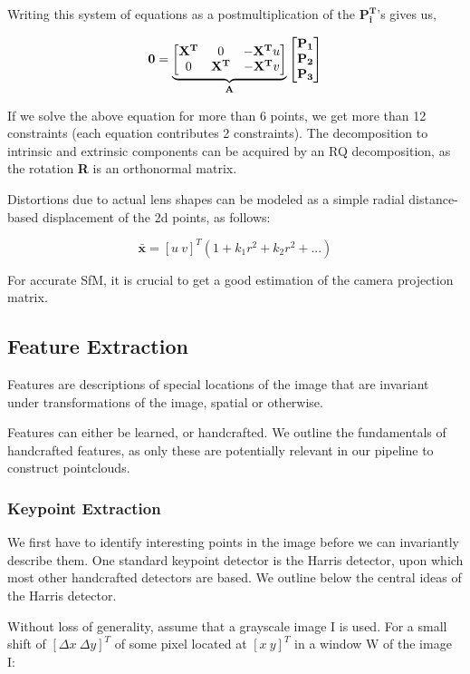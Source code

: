 Writing this system of equations as a postmultiplication of the $\mathbf{P_i^T}$'s gives us,

\[\mathbf{0} = \underbrace{\begin{bmatrix}
\mathbf{X^T} & 0 & -\mathbf{X^T}u\\
0 & \mathbf{X^T} & -\mathbf{X^T}v\\
\end{bmatrix}}_{\text{\textbf{A}}} \begin{bmatrix}
\mathbf{P_1}\\
\mathbf{P_2}\\
\mathbf{P_3}\end{bmatrix}\]

If we solve the above equation for more than 6 points, we get more than 12 constraints (each equation contributes 2 constraints). The decomposition to intrinsic and extrinsic components can be acquired by an RQ decomposition, as the rotation \textbf{R} is an orthonormal matrix.

Distortions due to actual lens shapes can be modeled as a simple radial distance-based displacement of the 2d points, as follows:

\[\bar{\mathbf{x}} = [u\ v]^T (1 + k_1r^2 + k_2r^2 + ...)\]

For accurate SfM, it is crucial to get a good estimation of the camera projection matrix. 

\subsection{Feature Extraction}
Features are descriptions of special locations of the image that are invariant under transformations of the image, spatial or otherwise. 

Features can either be learned, or handcrafted. We outline the fundamentals of handcrafted features, as only these are potentially relevant in our pipeline to construct pointclouds.

\subsubsection{Keypoint Extraction}
We first have to identify interesting points in the image before we can invariantly describe them. One standard keypoint detector is the Harris detector, upon which most other handcrafted detectors are based. We outline below the central ideas of the Harris detector. 

Without loss of generality, assume that a grayscale image I is used. For a small shift of $[\Delta x \ \Delta y]^T$ of some pixel located at $[x \ y]^T$ in a window W of the image I:

